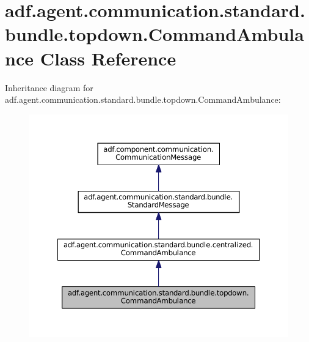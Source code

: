 \hypertarget{classadf_1_1agent_1_1communication_1_1standard_1_1bundle_1_1topdown_1_1CommandAmbulance}{}\section{adf.\+agent.\+communication.\+standard.\+bundle.\+topdown.\+Command\+Ambulance Class Reference}
\label{classadf_1_1agent_1_1communication_1_1standard_1_1bundle_1_1topdown_1_1CommandAmbulance}


Inheritance diagram for adf.\+agent.\+communication.\+standard.\+bundle.\+topdown.\+Command\+Ambulance\+:
\nopagebreak
\begin{figure}[H]
\begin{center}
\leavevmode
\includegraphics[width=350pt]{classadf_1_1agent_1_1communication_1_1standard_1_1bundle_1_1topdown_1_1CommandAmbulance__inherit__graph}
\end{center}
\end{figure}


